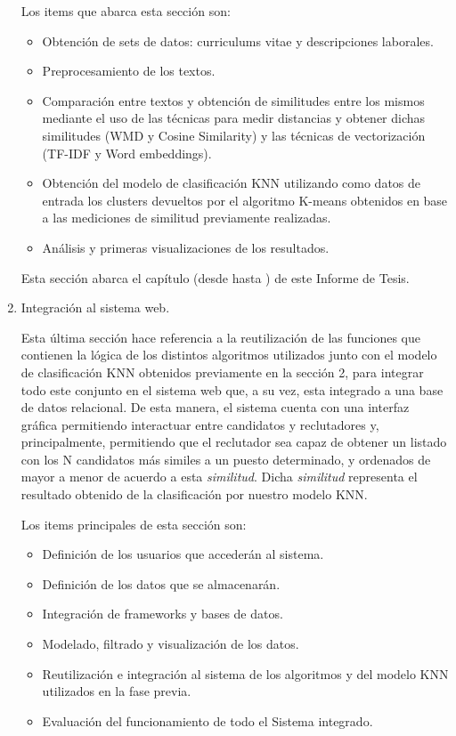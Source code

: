 \documentclass[12pt,a4paper]{article}
\begin{document}
\begin{sloppypar}
\begin{enumerate}
\cleardoublepage    %

Los items que abarca esta sección son:

\begin{itemize}
	\item Obtención de sets de datos: curriculums vitae y descripciones laborales. 
	\item Preprocesamiento de los textos.
	\item Comparación entre textos y obtención de similitudes entre los mismos mediante el uso de las técnicas para medir distancias y obtener dichas similitudes (WMD y Cosine Similarity) y las técnicas de vectorización (TF-IDF y Word embeddings).
	\item Obtención del modelo de clasificación KNN utilizando como datos de entrada los clusters devueltos por el algoritmo K-means obtenidos en base a las mediciones de similitud previamente realizadas.
	\item Análisis y primeras visualizaciones de los resultados.
\end{itemize} 
 
Esta sección abarca el capítulo \textit{} (desde \textit{} hasta \textit{}) de este Informe de Tesis. \\

\item Integración al sistema web.

Esta última sección hace referencia a la reutilización de las funciones que contienen la lógica de los distintos algoritmos utilizados junto con el modelo de clasificación KNN obtenidos previamente en la sección 2, para integrar todo este conjunto en el sistema web que, a su vez, esta integrado a una base de datos relacional. De esta manera, el sistema cuenta con una interfaz gráfica permitiendo interactuar entre candidatos y reclutadores y, principalmente, permitiendo que el reclutador sea capaz de obtener un listado con los N candidatos más similes a un puesto determinado, y ordenados de mayor a menor de acuerdo a esta \textit{similitud}. Dicha \textit{similitud} representa el resultado obtenido de la clasificación por nuestro modelo KNN. 

Los items principales de esta sección son:
\begin{itemize}
	\item Definición de los usuarios que accederán al sistema.
	\item Definición de los datos que se almacenarán.
	\item Integración de frameworks y bases de datos.  
	\item Modelado, filtrado y visualización de los datos.
	\item Reutilización e integración al sistema de los algoritmos y del modelo KNN utilizados en la fase previa.	
	\item Evaluación del funcionamiento de todo el Sistema integrado.
\end{itemize} 


\end{enumerate}
\end{sloppypar}
\end{document}
